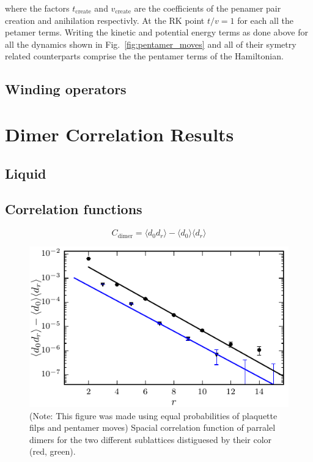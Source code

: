 \documentclass[aps,floatfix,11pt,twocolumn]{revtex4-1}
\begin{document}
        where the factors $t_{\mathrm{create}}$ and $v_{\mathrm{create}}$ are the coefficients of
        the penamer pair creation and anihilation respectivly. At the RK point
        $t/v=1$ for each all the petamer terms. 
        Writing the kinetic and potential energy terms as done above for all the dynamics shown in
        Fig.~\ref{fig:pentamer_moves} and all of their symetry related counterparts comprise the
        the pentamer terms of the Hamiltonian. 

    \subsection{Winding operators}

\section{Dimer Correlation Results}

    \subsection{Liquid}


    \subsection{Correlation functions}

    \begin{equation}
        C_{\mathrm{dimer}} = \langle d_0 d_r \rangle - \langle d_0 \rangle   \langle d_r \rangle   
    \end{equation}

    \begin{figure}[htpb]
        \centering
        \includegraphics[width=0.8\linewidth]{spacial_dmr_cor.pdf}
        \caption{(Note: This figure was made using equal probabilities of plaquette filps and
        pentamer moves) Spacial correlation function of parralel dimers for the two different
        sublattices distiguesed by their color (red, green).}
        \label{fig:spacial_dmr_cor}
    \end{figure}
\end{document}
